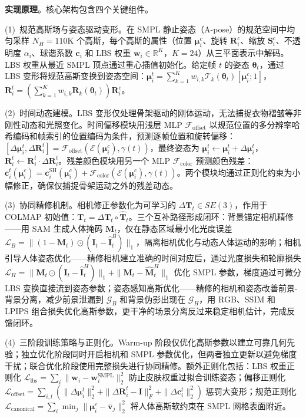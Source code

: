 \textbf{实现原理}。核心架构包含四个关键组件。

(1)~规范高斯场与姿态驱动变形。在 SMPL 静止姿态（A-pose）的规范空间中均匀采样 $N_H{=}110\text{K}$ 个高斯，每个高斯的属性（位置 $\boldsymbol{\mu}_i^c$、旋转 $\mathbf{R}_i^c$、缩放 $\mathbf{S}_i^c$、不透明度 $\alpha_i$、球谐系数 $\mathbf{c}_i$ 和 LBS 权重 $\mathbf{w}_i \in \mathbb{R}^{K}$，$K{=}24$）从三平面表示中解码。LBS 权重从最近 SMPL 顶点通过重心插值初始化。给定帧 $t$ 的姿态 $\boldsymbol{\theta}_t$，通过 LBS 变形将规范高斯变换到姿态空间：$\boldsymbol{\mu}_i^t = \sum_{k=1}^{K} w_{i,k} \mathcal{T}_k(\boldsymbol{\theta}_t) [\boldsymbol{\mu}_i^c; 1]$，$\mathbf{R}_i^t = (\sum_{k=1}^{K} w_{i,k} \mathbf{R}_k(\boldsymbol{\theta}_t)) \mathbf{R}_i^c$。

(2)~时间动态建模。LBS 变形仅处理骨架驱动的刚体运动，无法捕捉衣物褶皱等非刚性动态和光照变化。时间偏移模块用浅层 MLP $\mathcal{F}_{\text{offset}}$ 以规范位置的多分辨率哈希编码和帧索引的位置编码为条件，预测逐帧位置和旋转偏移：$[\Delta\boldsymbol{\mu}_i^t, \Delta\mathbf{R}_i^t] = \mathcal{F}_{\text{offset}}(\mathcal{E}(\boldsymbol{\mu}_i^c), \gamma(t))$，最终姿态为 $\boldsymbol{\mu}_i^t \leftarrow \boldsymbol{\mu}_i^t + \Delta\boldsymbol{\mu}_i^t$，$\mathbf{R}_i^t \leftarrow \mathbf{R}_i^t \cdot \Delta\mathbf{R}_i^t$。残差颜色模块用另一个 MLP $\mathcal{F}_{\text{color}}$ 预测颜色残差：$\mathbf{c}_i^t(\boldsymbol{\mu}_i^c) = \mathbf{c}_i^{\text{SH}}(\boldsymbol{\mu}_i^c) + \mathcal{F}_{\text{color}}(\mathcal{E}(\boldsymbol{\mu}_i^c), \gamma(t))$。两个模块均通过正则化约束为小幅修正，确保仅捕捉骨架运动之外的残差动态。

(3)~协同精修机制。相机修正参数化为可学习的 $\Delta\mathbf{T}_t \in SE(3)$，作用于 COLMAP 初始值：$\mathbf{T}_t = \Delta\mathbf{T}_t \circ \hat{\mathbf{T}}_t$。三个互补路径形成闭环：背景锚定相机精修——用 SAM 生成人体掩码 $\mathbf{M}_t$，仅在静态区域最小化光度误差 $\mathcal{L}_B = \|(1-\mathbf{M}_t) \odot (\mathbf{I}_t - \hat{\mathbf{I}}_t^B)\|_1$，隔离相机优化与动态人体运动的影响；相机引导人体姿态优化——精修相机建立准确的时间对应后，通过光度损失和轮廓损失 $\mathcal{L}_H = \|\mathbf{M}_t \odot (\mathbf{I}_t - \hat{\mathbf{I}}_t^H)\|_1 + \|\mathbf{M}_t - \hat{\mathbf{M}}_t^H\|_1$ 优化 SMPL 参数，梯度通过可微分 LBS 变换直接流到姿态参数；姿态感知高斯优化——精修的相机和姿态改善前景-背景分离，减少前景泄漏到 $\mathcal{G}_B$ 和背景伪影出现在 $\mathcal{G}_H$，用 RGB、SSIM 和 LPIPS 组合损失优化高斯参数，更干净的场景分离反过来稳定相机估计，完成反馈闭环。

(4)~三阶段训练策略与正则化。Warm-up 阶段仅优化高斯参数以建立可靠几何先验；独立优化阶段同时开启相机和 SMPL 参数优化，但两者独立更新以避免梯度干扰；联合优化阶段使用完整损失进行协同精修。额外正则化包括：LBS 权重正则化 $\mathcal{L}_{\text{lbs}} = \sum_{i} \|\mathbf{w}_i - \mathbf{w}_i^{\text{SMPL}}\|_2^2$ 防止皮肤权重过拟合训练姿态；偏移正则化 $\mathcal{L}_{\text{offset}} = \sum_{i,t}(\|\Delta\boldsymbol{\mu}_i^t\|_2^2 + \|\Delta\mathbf{R}_i^t - \mathbf{I}\|_F^2 + \|\Delta\mathbf{c}_i^t\|_2^2)$ 惩罚大变形；规范正则化 $\mathcal{L}_{\text{canonical}} = \sum_i \min_j \|\boldsymbol{\mu}_i^c - \bar{\mathbf{v}}_j\|_2^2$ 将人体高斯软约束在 SMPL 网格表面附近。

